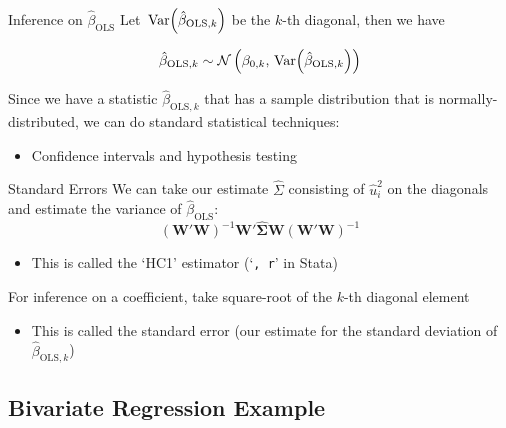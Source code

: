 \documentclass[aspectratio=169,t,11pt,table]{beamer}
\begin{document}
\begin{frame}{Inference on $\hat{\beta}_{\text{OLS}}$}
  Let $\var{\hat{\beta}_{\text{OLS}, k}}$ be the $k$-th diagonal, then we have 

  $$
    \hat{\beta}_{\text{OLS}, k} \sim 
    \mathcal{N}\left( \beta_{0,k}, \var{\hat{\beta}_{\text{OLS}, k}} \right)
  $$

  \bigskip
  Since we have a statistic $\hat{\beta}_{\text{OLS}, k}$ that has a sample distribution that is normally-distributed, we can do standard statistical techniques: 
  \begin{itemize}
    \item Confidence intervals and hypothesis testing
  \end{itemize}
\end{frame}

\begin{frame}{Standard Errors}
  We can take our estimate $\hat{\Sigma}$ consisting of $\hat{u}_i^2$ on the diagonals and estimate the variance of $\hat{\beta}_{\text{OLS}}$:
  $$
    \left(\bm{W}' \bm{W} \right)^{-1} \bm{W}' \hat{\bm{\Sigma}} \bm{W} \left(\bm{W}' \bm{W} \right)^{-1}
  $$

  \begin{itemize}
    \item This is called the `HC1' estimator (`\texttt{, r}' in Stata)
  \end{itemize}

  \pause
  \bigskip
  For inference on a coefficient, take square-root of the $k$-th diagonal element
  \begin{itemize}
    \item This is called the \alert{standard error} (our estimate for the standard deviation of $\hat{\beta}_{\text{OLS}, k}$)
  \end{itemize}
\end{frame}

% 
%   


\subsection{Bivariate Regression Example}
\end{document}
